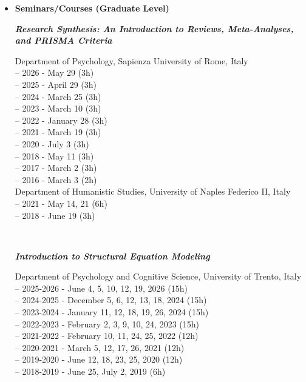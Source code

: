 \documentclass[hidelinks, letterpaper,10pt]{article} %
\begin{document}
\begin{itemize}
\item {\textbf{\large{Seminars/Courses (Graduate Level)}}}

	\begin{center}
		\parbox{6.5in}{\textit{\textbf{Research Synthesis: An Introduction to Reviews, Meta-Analyses, and PRISMA Criteria}}}
		\parbox{6.5in} {
		Department of Psychology, Sapienza University of Rome, Italy \\
		-- 2026 - May 29 (3h) \\
		-- 2025 - April 29 (3h) \\		
		-- 2024 - March 25 (3h) \\
		-- 2023 - March 10 (3h) \\
		-- 2022 - January 28 (3h) \\
		-- 2021 - March 19 (3h) \\
		-- 2020 - July 3 (3h) \\
		-- 2018 - May 11 (3h) \\
		-- 2017 - March 2 (3h) \\
		-- 2016 - March 3 (2h) \\
		Department of Humanistic Studies, University of Naples Federico II, Italy \\
		-- 2021 - May 14, 21 (6h) \\ 
		-- 2018 - June 19 (3h)} \\
		\vspace{3mm}
	\end{center}

	\begin{center}
		\parbox{6.5in}{\textit{\textbf{Introduction to Structural Equation Modeling}}}
		\parbox{6.5in} {Department of Psychology and Cognitive Science, University of Trento, Italy \\
		-- 2025-2026 - June 4, 5, 10, 12, 19, 2026 (15h) \\
		-- 2024-2025 - December 5, 6, 12, 13, 18, 2024 (15h) \\
		-- 2023-2024 - January 11, 12, 18, 19, 26, 2024 (15h) \\
		-- 2022-2023 - February 2, 3, 9, 10, 24, 2023 (15h) \\
        -- 2021-2022 - February 10, 11, 24, 25, 2022 (12h) \\
		-- 2020-2021 - March 5, 12, 17, 26, 2021 (12h) \\
		-- 2019-2020 - June 12, 18, 23, 25, 2020 (12h) \\
		-- 2018-2019 - June 25, July 2, 2019 (6h)} \\
		\vspace{3mm}
	\end{center}
	

\end{itemize}
\end{document}
